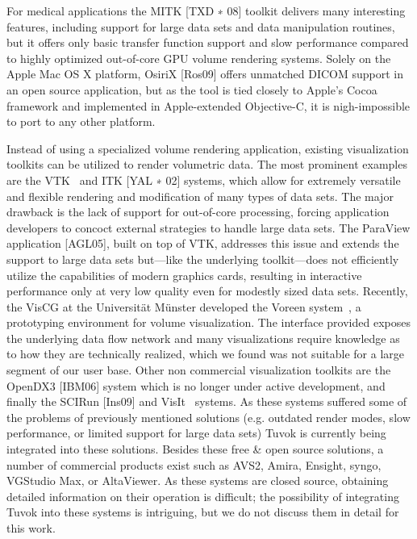 For medical applications the MITK [TXD ∗ 08] toolkit 
delivers many interesting features, including support for large
data sets and data manipulation routines, but it offers only
basic transfer function support and slow performance compared
to highly optimized out-of-core GPU volume rendering
systems. Solely on the Apple Mac OS X platform,
OsiriX [Ros09] offers unmatched DICOM support in an
open source application, but as the tool is tied closely to Apple's
Cocoa framework and implemented in Apple-extended
Objective-C, it is nigh-impossible to port to any other platform.

Instead of using a specialized volume rendering application,
existing visualization toolkits can be utilized to render
volumetric data. The most prominent examples are the
VTK~\cite{Schroeder:2006:VTK} and ITK [YAL ∗ 02] systems, which allow
for extremely versatile and flexible rendering and modification
of many types of data sets. The major drawback is
the lack of support for out-of-core processing, forcing
application developers to concoct external strategies to handle
large data sets. The ParaView application [AGL05], built on
top of VTK, addresses this issue and extends the support to
large data sets but---like the underlying toolkit---does not
efficiently utilize the capabilities of modern graphics cards,
resulting in interactive performance only at very low quality
even for modestly sized data sets. Recently, the VisCG
at the Universit\"at M\"unster developed the Voreen
system~\cite{Voreen:2009}, a prototyping environment for volume
visualization.  The interface provided exposes the underlying data
flow network and many visualizations require knowledge as to how
they are technically realized, which we found was not suitable for a
large segment of our user base. Other non commercial visualization
toolkits are the OpenDX3 [IBM06] system which is no longer under active
development, and
finally the SCIRun [Ins09] and VisIt~\cite{Childs:2005:Contracts,
Childs:2012:VisIt} systems. As these systems suffered some of the
problems of previously mentioned solutions (e.g. outdated render modes,
slow performance, or limited support for large data sets) Tuvok is
currently being integrated into these solutions. Besides these free
\& open source solutions, a number of commercial products exist such
as AVS2, Amira, Ensight, syngo, VGStudio Max, or AltaViewer. As these
systems are closed source, obtaining detailed information on their
operation is difficult; the possibility of integrating Tuvok into these
systems is intriguing, but we do not discuss them in detail for this
work.

